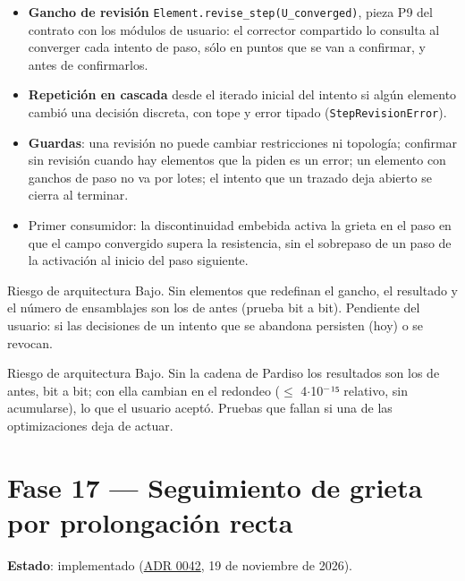 \documentclass[11pt,oneside]{report}
\begin{document}
\begin{itemize}
  \item \textbf{Gancho de revisión} \texttt{Element.\allowbreak{}revise\_\allowbreak{}step(U\_\allowbreak{}converged)}, pieza P9 del contrato con los módulos de usuario: el corrector compartido lo consulta al converger cada intento de paso, sólo en puntos que se van a confirmar, y antes de confirmarlos.
  \item \textbf{Repetición en cascada} desde el iterado inicial del intento si algún elemento cambió una decisión discreta, con tope y error tipado (\texttt{StepRevisionError}).
  \item \textbf{Guardas}: una revisión no puede cambiar restricciones ni topología; confirmar sin revisión cuando hay elementos que la piden es un error; un elemento con ganchos de paso no va por lotes; el intento que un trazado deja abierto se cierra al terminar.
  \item Primer consumidor: la discontinuidad embebida activa la grieta en el paso en que el campo convergido supera la resistencia, sin el sobrepaso de un paso de la activación al inicio del paso siguiente.
\end{itemize}

\begin{infobox}{Riesgo de arquitectura}
Bajo. Sin elementos que redefinan el gancho, el resultado y el número de ensamblajes son los de antes (prueba bit a bit). Pendiente del usuario: si las decisiones de un intento que se abandona persisten (hoy) o se revocan.
\end{infobox}

\begin{infobox}{Riesgo de arquitectura}
Bajo. Sin la cadena de Pardiso los resultados son los de antes, bit a bit; con ella cambian en el redondeo (\ensuremath{\le} 4\ensuremath{\cdot}10\ensuremath{^{-}}¹⁵ relativo, sin acumularse), lo que el usuario aceptó. Pruebas que fallan si una de las optimizaciones deja de actuar.
\end{infobox}

\section{Fase 17 --- Seguimiento de grieta por prolongación recta}

\textbf{Estado}: implementado (\hyperref[adr:0042]{ADR 0042}, 19 de noviembre de 2026).
\end{document}
